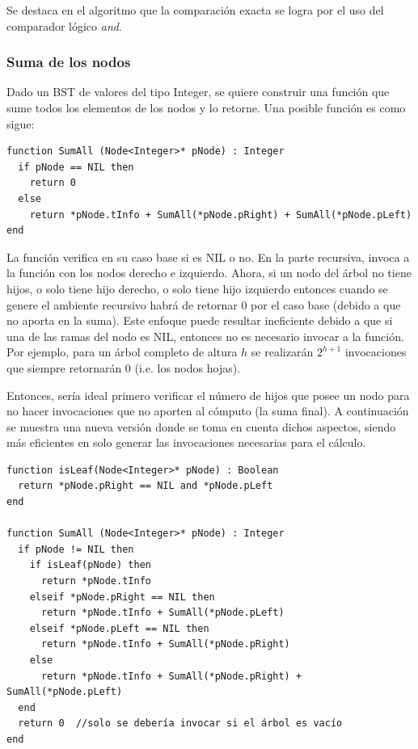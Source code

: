Se destaca en el algoritmo que la comparación exacta se logra por el uso del comparador lógico \textit{and}.

\subsubsection{Suma de los nodos}

Dado un BST de valores del tipo Integer, se quiere construir una función que sume todos los elementos de los nodos y lo retorne. Una posible función es como sigue:

\begin{lstlisting}[upquote=true, language=pseudo]
function SumAll (Node<Integer>* pNode) : Integer
  if pNode == NIL then
    return 0
  else
    return *pNode.tInfo + SumAll(*pNode.pRight) + SumAll(*pNode.pLeft)
end
\end{lstlisting}

La función verifica en su caso base si es NIL o no. En la parte recursiva, invoca a la función con los nodos derecho e izquierdo. Ahora, si un nodo del árbol no tiene hijos, o solo tiene hijo derecho, o solo tiene hijo izquierdo entonces cuando se genere el ambiente recursivo habrá de retornar 0 por el caso base (debido a que no aporta en la suma). Este enfoque puede resultar ineficiente debido a que si una de las ramas del nodo es NIL, entonces no es necesario invocar a la función. Por ejemplo, para un árbol completo de altura $h$ se realizarán $2^{h+1}$ invocaciones que siempre retornarán 0 (i.e. los nodos hojas).

Entonces, sería ideal primero verificar el número de hijos que posee un nodo para no hacer invocaciones que no aporten al cómputo (la suma final). A continuación se muestra una nueva versión donde se toma en cuenta dichos aspectos, siendo más eficientes en solo generar las invocaciones necesarias para el cálculo.

\begin{lstlisting}[upquote=true, language=pseudo]
function isLeaf(Node<Integer>* pNode) : Boolean
  return *pNode.pRight == NIL and *pNode.pLeft
end

function SumAll (Node<Integer>* pNode) : Integer
  if pNode != NIL then
    if isLeaf(pNode) then
      return *pNode.tInfo
    elseif *pNode.pRight == NIL then
      return *pNode.tInfo + SumAll(*pNode.pLeft)
    elseif *pNode.pLeft == NIL then
      return *pNode.tInfo + SumAll(*pNode.pRight)
    else
      return *pNode.tInfo + SumAll(*pNode.pRight) + SumAll(*pNode.pLeft)
  end
  return 0	//solo se debería invocar si el árbol es vacío
end
\end{lstlisting}

